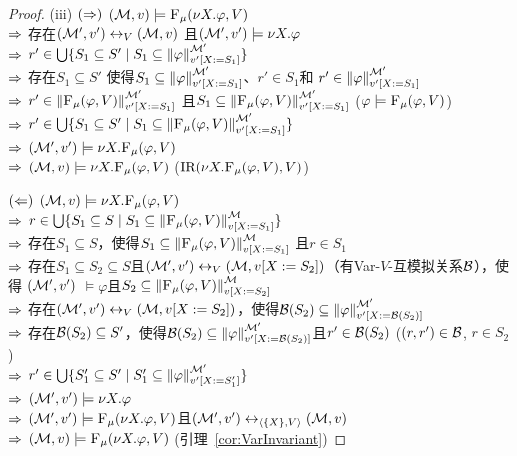 \begin{proof}
	
	(iii) $(\Rightarrow)$ $({\cal M},v) \models {\textsc{F}_{\textsc{$\mu$}}}(\nu X. \varphi, V)$\\
	$\Rightarrow$ 存在$({\cal M}', v') \leftrightarrow_V ({\cal M},v)$ 且$({\cal M}',v') \models \nu X. \varphi$\\
	$\Rightarrow$ $r' \in \bigcup \{S_1 \subseteq S' \mid S_1 \subseteq \left\|\varphi\right\|_{v'[X:=S_1]}^{{\cal M}'}\}$\\
	$\Rightarrow$ 存在$S_1 \subseteq S'$ 使得$S_1 \subseteq \left\|\varphi\right\|_{v'[X:=S_1]}^{{\cal M}'}$、$r'\in S_1$和 $r'\in \left\|\varphi\right\|_{v'[X:=S_1]}^{{\cal M}'}$\\
	$\Rightarrow$ $r' \in \left\|{\textsc{F}_{\textsc{$\mu$}}}(\varphi,V)\right\|_{v'[X:=S_1]}^{{\cal M}'}$ 且$S_1 \subseteq \left\|{\textsc{F}_{\textsc{$\mu$}}}(\varphi,V)\right\|_{v'[X:=S_1]}^{{\cal M}'}$ \hfill ($\varphi \models {\textsc{F}_{\textsc{$\mu$}}}(\varphi,V)$)\\
	$\Rightarrow$ $r'\in \bigcup \{S_1 \subseteq S' \mid S_1 \subseteq \left\|{\textsc{F}_{\textsc{$\mu$}}}(\varphi,V)\right\|_{v'[X:=S_1]}^{{\cal M}'}\}$\\
	$\Rightarrow$ $({\cal M}',v')\models \nu X. {\textsc{F}_{\textsc{$\mu$}}}(\varphi,V)$\\
	$\Rightarrow$ $({\cal M},v) \models \nu X. {\textsc{F}_{\textsc{$\mu$}}}(\varphi,V)$ \hfill  ($\textrm{IR}(\nu X. {\textsc{F}_{\textsc{$\mu$}}}(\varphi,V), V)$)
	
	$(\Leftarrow)$ $({\cal M},v)\models \nu X. {\textsc{F}_{\textsc{$\mu$}}}(\varphi,V)$\\
	$\Rightarrow$ $r\in \bigcup \{S_1 \subseteq S \mid S_1 \subseteq \left\|{\textsc{F}_{\textsc{$\mu$}}}(\varphi,V)\right\|_{v[X:=S_1]}^{{\cal M}}\}$\\
	$\Rightarrow$ 存在$S_1 \subseteq S$，使得$S_1 \subseteq \left\|{\textsc{F}_{\textsc{$\mu$}}}(\varphi,V)\right\|_{v[X:=S_1]}^{{\cal M}}$ 且$r \in S_1$\\
	$\Rightarrow$ 存在$S_1\subseteq S_2 \subseteq S$且$({\cal M}',v') \leftrightarrow_V ({\cal M},v[X:= S_2])$（有Var-$V$-互模拟关系${\cal B}$），使得 $({\cal M}',v')$ $\models \varphi$且$S_2 \subseteq \left\|{\textsc{F}_{\textsc{$\mu$}}}(\varphi,V)\right\|_{v[X:=S_2]}^{{\cal M}}$\\
	$\Rightarrow$ 存在$({\cal M}',v') \leftrightarrow_V ({\cal M},v[X:= S_2])$，使得${\cal B}(S_2) \subseteq \left\|\varphi\right\|_{v'[X:={\cal B}(S_2)]}^{{\cal M}'}$\\
	$\Rightarrow$ 存在${\cal B}(S_2) \subseteq S'$，使得${\cal B}(S_2) \subseteq \left\|\varphi\right\|_{v'[X:={\cal B}(S_2)]}^{{\cal M}'}$且$r'\in {\cal B}(S_2)$ \hfill ($(r,r')\in {\cal B}$, $r \in S_2$) \\
	$\Rightarrow$ $r'\in \bigcup \{S_1' \subseteq S' \mid S_1' \subseteq \left\|\varphi\right\|_{v'[X:=S_1']}^{{\cal M}'}\}$\\
	$\Rightarrow$ $({\cal M}',v') \models \nu X. \varphi$ \\ %
	$\Rightarrow$ $({\cal M}',v') \models {\textsc{F}_{\textsc{$\mu$}}}(\nu X. \varphi, V)$且$({\cal M}',v') \leftrightarrow_{{\langle{\{X\},V}\rangle}} ({\cal M},v)$\\
	$\Rightarrow$ $({\cal M}, v) \models {\textsc{F}_{\textsc{$\mu$}}}(\nu X. \varphi, V)$ \hfill (引理~\ref{cor:VarInvariant})
	

\end{proof}
